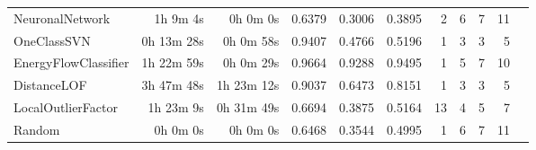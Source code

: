 \documentclass{article}
\begin{document}
\begin{table*}[t]
\begin{tabular}{lrrrrrrrrrr}
NeuronalNetwork & 1h 9m 4s & 0h 0m 0s & 0.6379 & 0.3006 & 0.3895 & 2 & 6 & 7 & 11 \\
OneClassSVN & 0h 13m 28s & 0h 0m 58s & 0.9407 & 0.4766 & 0.5196 & 1 & 3 & 3 & 5 \\
EnergyFlowClassifier & 1h 22m 59s & 0h 0m 29s & 0.9664 & 0.9288 & 0.9495 & 1 & 5 & 7 & 10 \\
DistanceLOF & 3h 47m 48s & 1h 23m 12s & 0.9037 & 0.6473 & 0.8151 & 1 & 3 & 3 & 5 \\
LocalOutlierFactor & 1h 23m 9s & 0h 31m 49s & 0.6694 & 0.3875 & 0.5164 & 13 & 4 & 5 & 7 \\
Random & 0h 0m 0s & 0h 0m 0s & 0.6468 & 0.3544 & 0.4995 & 1 & 6 & 7 & 11 \\
\midrule
\bottomrule
\end{tabular}
\end{table*}
\end{document}
